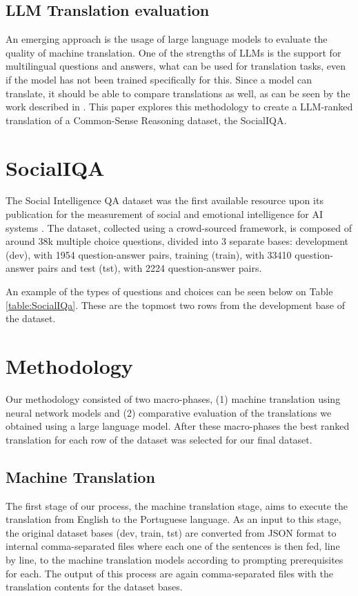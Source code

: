 \documentclass[runningheads]{llncs}
\begin{document}
\subsection{LLM Translation evaluation}

An emerging approach is the usage of large language models to evaluate the quality of machine translation. One of the strengths of LLMs is the support for multilingual questions and answers, what can be used for translation tasks, even if the model has not been trained specifically for this.
Since a model can translate, it should be able to compare translations as well, as can be seen by the work described in \cite{kocmi2023large}.
This paper explores this methodology to create a LLM-ranked translation of a Common-Sense Reasoning dataset, the SocialIQA.


\section{SocialIQA}
The Social Intelligence QA dataset was the first available resource upon its
publication for the measurement of social and emotional intelligence for AI
systems \cite{socialiqa}.
The dataset, collected using a crowd-sourced
framework, is composed of around 38k multiple choice questions, divided into 3
separate bases: development (dev), with 1954 question-answer pairs, training
(train), with 33410 question-answer pairs and test (tst), with 2224
question-answer pairs.

An example of the types of questions and choices can be seen below on Table
\ref{table:SocialIQa}. These are the topmost two rows from the development base
of the dataset.
 

\section{Methodology} 

Our methodology consisted of two macro-phases, (1) machine translation using
neural network models and (2) comparative evaluation of the translations we
obtained using a large language model. After these macro-phases the best ranked
translation for each row of the dataset was selected for our final dataset.

\subsection{Machine Translation}
\label{subsec:machine-translation}
The first stage of our process, the machine translation stage, aims to execute the translation from English to the Portuguese language. As an input to this stage, the original dataset bases (dev, train, tst) are converted from JSON format to  internal comma-separated files where each one of the sentences is then fed, line by line, to the machine translation models according to prompting prerequisites for each.
The output of this process are again comma-separated files with the translation contents for the dataset bases.
\end{document}
